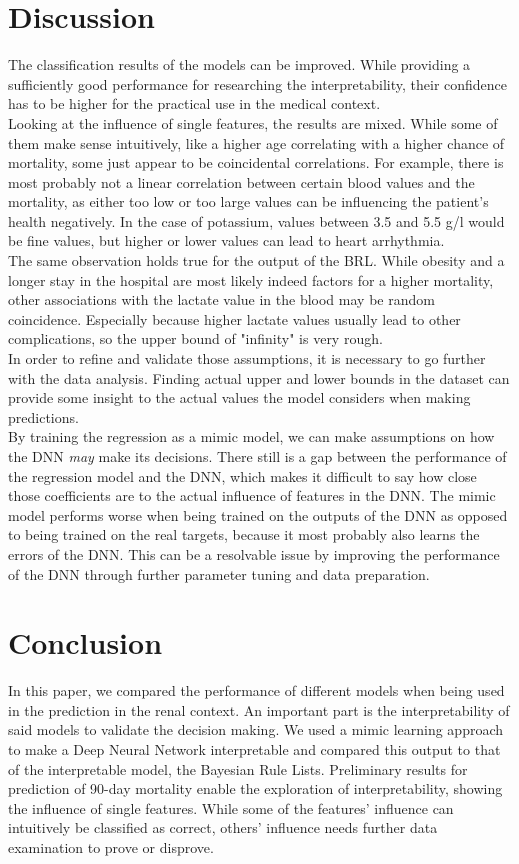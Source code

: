 \documentclass[conference,compsoc]{IEEEtran}
\begin{document}
\section{Discussion}
The classification results of the models can be improved.
While providing a sufficiently good performance for researching the interpretability, their confidence has to be higher for the practical use in the medical context. \\
Looking at the influence of single features, the results are mixed.
While some of them make sense intuitively, like a higher age correlating with a higher chance of mortality, some just appear to be coincidental correlations.
For example, there is most probably not a linear correlation between certain blood values and the mortality, as either too low or too large values can be influencing the patient's health negatively.
In the case of potassium, values between 3.5 and 5.5 \textmu g/l would be fine values, but higher or lower values can lead to heart arrhythmia. \\
The same observation holds true for the output of the BRL.
While obesity and a longer stay in the hospital are most likely indeed factors for a higher mortality, other associations with the lactate value in the blood may be random coincidence.
Especially because higher lactate values usually lead to other complications, so the upper bound of "infinity" is very rough. \\
In order to refine and validate those assumptions, it is necessary to go further with the data analysis.
Finding actual upper and lower bounds in the dataset can provide some insight to the actual values the model considers when making predictions. \\

By training the regression as a mimic model, we can make assumptions on how the DNN \emph{may} make its decisions.
There still is a gap between the performance of the regression model and the DNN, which makes it difficult to say how close those coefficients are to the actual influence of features in the DNN.
The mimic model performs worse when being trained on the outputs of the DNN as opposed to being trained on the real targets, because it most probably also learns the errors of the DNN.
This can be a resolvable issue by improving the performance of the DNN through further parameter tuning and data preparation.


\section{Conclusion}
In this paper, we compared the performance of different models when being used in the prediction in the renal context.
An important part is the interpretability of said models to validate the decision making.
We used a mimic learning approach to make a Deep Neural Network interpretable and compared this output to that of the interpretable model, the Bayesian Rule Lists.
Preliminary results for prediction of 90-day mortality enable the exploration of interpretability, showing the influence of single features.
While some of the features' influence can intuitively be classified as correct, others' influence needs further data examination to prove or disprove. \\
\end{document}
